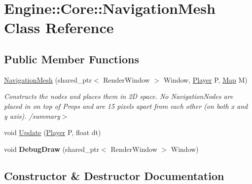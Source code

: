 \hypertarget{class_engine_1_1_core_1_1_navigation_mesh}{}\section{Engine\+:\+:Core\+:\+:Navigation\+Mesh Class Reference}
\label{class_engine_1_1_core_1_1_navigation_mesh}
\subsection*{Public Member Functions}
\begin{DoxyCompactItemize}
\item 
\hyperlink{class_engine_1_1_core_1_1_navigation_mesh_a7c1d1dfb88aeb8d53a9d99bca5e67a66}{Navigation\+Mesh} (shared\+\_\+ptr$<$ Render\+Window $>$ Window, \hyperlink{class_engine_1_1_game_play_1_1_player}{Player} P, \hyperlink{class_engine_1_1_core_1_1_map}{Map} M)
\begin{DoxyCompactList}\small\item\em Constructs the nodes and places them in 2D space. No Navigation\+Nodes are placed in on top of Props and are 15 pixels apart from each other (on both x and y axis). /summary$>$ \end{DoxyCompactList}\item 
void \hyperlink{class_engine_1_1_core_1_1_navigation_mesh_a5f2b7d3b8c7e5ea747f9d8a7c5b432e5}{Update} (\hyperlink{class_engine_1_1_game_play_1_1_player}{Player} P, float dt)
\item 
\mbox{\label{class_engine_1_1_core_1_1_navigation_mesh_a86758b74b81e8e48ddbf14466e8e9325}} 
void {\bfseries Debug\+Draw} (shared\+\_\+ptr$<$ Render\+Window $>$ Window)
\end{DoxyCompactItemize}


\subsection{Constructor \& Destructor Documentation}
\mbox{\label{class_engine_1_1_core_1_1_navigation_mesh_a7c1d1dfb88aeb8d53a9d99bca5e67a66}} 
